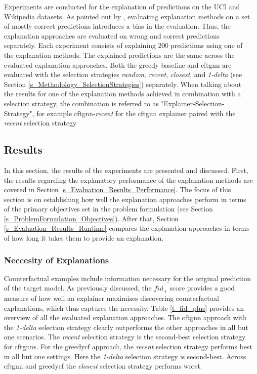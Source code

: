 Experiments are conducted for the explanation of predictions on the UCI and Wikipedia datasets. As pointed out by \cite{amara_graphframex_2022}, evaluating explanation methods on a set of mostly correct predictions introduces a bias in the evaluation. Thus, the explanation approaches are evaluated on wrong and correct predictions separately. Each experiment consists of explaining $200$ predictions using one of the explanation methods. The explained predictions are the same across the evaluated explanation approaches. Both the greedy baseline and \gls{cftgnn} are evaluated with the selection strategies \textit{random}, \textit{recent}, \textit{closest}, and \textit{1-delta} (see Section \ref{s_Methodology_SelectionStrategies}) separately. When talking about the results for one of the explanation methods achieved in combination with a selection strategy, the combination is referred to as "Explainer-Selection-Strategy", for example \gls{cftgnn}-\textit{recent} for the \gls{cftgnn} explainer paired with the \textit{recent} selection strategy

\FloatBarrier
\subsection{Results}
\label{s_Evaluation_Results}

In this section, the results of the experiments are presented and discussed. First, the results regarding the explanatory performance of the explanation methods are covered in Section \ref{s_Evaluation_Results_Performance}. The focus of this section is on establishing how well the explanation approaches perform in terms of the primary objectives set in the problem formulation (see Section \ref{s_ProblemFormulation_Objectives}). After that, Section \ref{s_Evaluation_Results_Runtime} compares the explanation approaches in terms of how long it takes them to provide an explanation. 



 
\FloatBarrier
\subsubsection{Neccesity of Explanations}
\label{s_Evaluation_Results_Neccesity}

Counterfactual examples include information necessary for the original prediction of the target model. As previously discussed, the $fid_+$ score provides a good measure of how well an explainer maximizes discovering counterfactual explanations, which thus captures the necessity. Table \ref{t_fid_plus} provides an overview of all the evaluated explanation approaches. The \gls{cftgnn} approach with the \textit{1-delta} selection strategy clearly outperforms the other approaches in all but one scenarios. The \textit{recent} selection strategy is the second-best selection strategy for \glspl{cftgnn}. For the \gls{greedycf} approach, the \textit{recent} selection strategy performs best in all but one settings. Here the \textit{1-delta} selection strategy is second-best. Across \gls{cftgnn} and \gls{greedycf} the \textit{closest} selection strategy performs worst.


